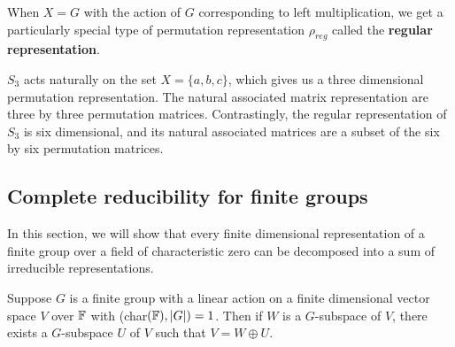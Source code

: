 \documentclass[a4paper]{article}
\begin{document}
When $X = G$ with the action of $G$ corresponding to left multiplication, we get a particularly special type of permutation representation $\rho_{reg}$ called the \textbf{regular representation}. 

\begin{eg}[Representations of $S_3$] 
    $S_3$ acts naturally on the set $X = \{a,b,c\}$, which gives us a three dimensional permutation representation. The natural associated matrix representation are three by three permutation matrices. Contrastingly, the regular representation of $S_3$ is six dimensional, and its natural associated matrices are a subset of the six by six permutation matrices.
\end{eg}

\subsection{Complete reducibility for finite groups}

In this section, we will show that every finite dimensional representation of a finite group over a field of characteristic zero can be decomposed into a sum of irreducible representations.

\begin{thm}
    Suppose $G$ is a finite group with a linear action on a finite dimensional vector space $V$ over $\mathbb{F}$ with (char$(\mathbb{F}), |G|) = 1$. Then if $W$ is a $G$-subspace of $V$, there exists a $G$-subspace $U$ of $V$ such that $V = W \oplus U$.
\end{thm}
\end{document}
